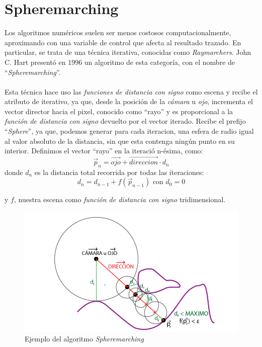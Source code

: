 \section{Spheremarching\label{sec:spheremarching}}
Los algoritmos numéricos suelen ser menos costosos computacionalmente, aproximando con una variable de control que afecta al resultado trazado. En particular, se trata de una técnica iterativa, conocidas como \textit{Raymarchers}. John C. Hart presentó en 1996 un algoritmo de esta categoría, con el nombre de  \enquote{\textit{Spheremarching}}\cite{hart1996sphere}.\\\\
Esta técnica hace uso las \textit{funciones de distancia con signo} como escena y recibe el atributo de iterativo, ya que, desde la posición de la \textit{cámara} u \textit{ojo}, incrementa el vector director hacia el pixel, conocido como \enquote{rayo} y es proporcional a la \textit{función de distancia con signo} devuelto por el vector iterado. Recibe el prefijo \enquote{\textit{Sphere}\textendash}, ya que, podemos generar para cada iteracion, una esfera de radio igual al valor absoluto de la distancia, sin que esta contenga ningún punto en su interior. Definimos el vector \enquote{rayo} en la iteració n-ésima, como:
\[ \Vec{p}_{n}=\Vec{ojo} + \Vec{direccion} \cdot d_{n} \]
donde \(d_{n}\) es la distancia total recorrida por todas las iteraciones:
\[d_{n}=d_{n-1} + f(\Vec{p}_{n-1})\text{ con } d_0=0\]

y \(f\), nuestra escena como \textit{función de distancia con signo} tridimensional.

 \begin{figure}[H]
  \centering
  \captionsetup{justification=centering}%
  \includegraphics[width=1.0\textwidth]{secciones/imagenes/starting/spheremarching.png}
  \caption{Ejemplo del algoritmo \textit{Spheremarching}}
  \label{fig:spheremarcher}
\end{figure}

